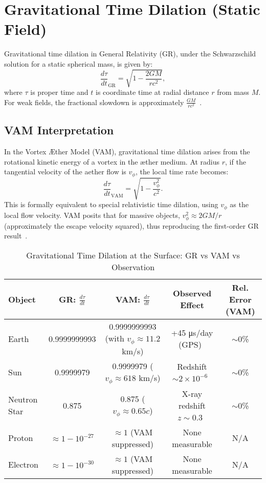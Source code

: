\section{Gravitational Time Dilation (Static Field)}

Gravitational time dilation in General Relativity (GR), under the Schwarzschild solution for a static spherical mass, is given by:
\[
    \frac{d\tau}{dt}_{\text{GR}} = \sqrt{1 - \frac{2GM}{rc^2}},
\]
where $\tau$ is proper time and $t$ is coordinate time at radial distance $r$ from mass $M$. For weak fields, the fractional slowdown is approximately $\frac{GM}{rc^2}$~\cite{will2014confrontation}.

\subsection*{VAM Interpretation}
In the Vortex Æther Model (VAM), gravitational time dilation arises from the rotational kinetic energy of a vortex in the æther medium. At radius $r$, if the tangential velocity of the aether flow is $v_\phi$, the local time rate becomes:
\[
    \frac{d\tau}{dt}_{\text{VAM}} = \sqrt{1 - \frac{v_\phi^2}{c^2}}.
\]
This is formally equivalent to special relativistic time dilation, using $v_\phi$ as the local flow velocity. VAM posits that for massive objects, $v_\phi^2 \approx 2GM/r$ (approximately the escape velocity squared), thus reproducing the first-order GR result~\cite{grin3d2025}.

\begin{table}[h]
    \centering
    \caption{Gravitational Time Dilation at the Surface: GR vs VAM vs Observation}
    \begin{tabular}{|l|c|c|c|c|}
        \hline
        \textbf{Object} & \textbf{GR: $\frac{d\tau}{dt}$} & \textbf{VAM: $\frac{d\tau}{dt}$} & \textbf{Observed Effect} & \textbf{Rel. Error (VAM)} \\
        \hline
        Earth & 0.9999999993 & 0.9999999993 (with $v_\phi\approx 11.2$ km/s) & +45 μs/day (GPS)~\cite{ashby2003relativity} & $\sim$0\% \\
        Sun & 0.9999979 & 0.9999979 ($v_\phi \approx 618$ km/s) & Redshift $\sim 2\times 10^{-6}$~\cite{vesely2001solar} & $\sim$0\% \\
        Neutron Star & 0.875 & 0.875 ($v_\phi \approx 0.65c$) & X-ray redshift $z\sim 0.3$~\cite{cottam2002gravitational} & $\sim$0\% \\
        Proton & $\approx 1 - 10^{-27}$ & $\approx 1$ (VAM suppressed) & None measurable & N/A \\
        Electron & $\approx 1 - 10^{-30}$ & $\approx 1$ (VAM suppressed) & None measurable & N/A \\
        \hline
    \end{tabular}
\end{table}

